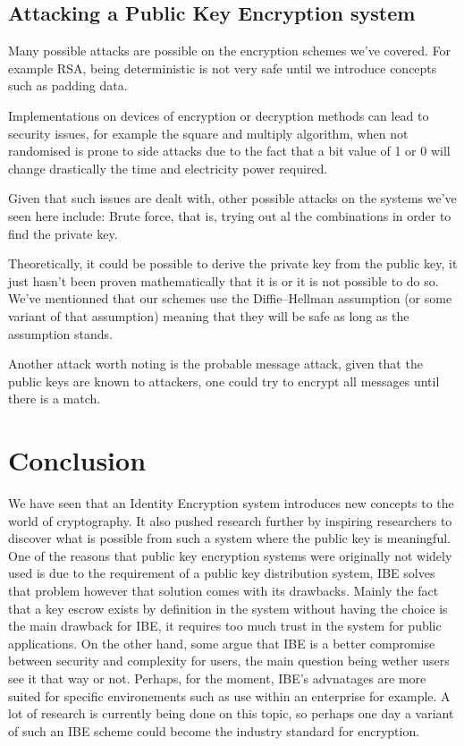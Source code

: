\documentclass[conference]{IEEEtran}
\begin{document}
\subsection{Attacking a Public Key Encryption system}
Many possible attacks are possible on the encryption schemes we've covered.
For example RSA, being deterministic is not very safe until we introduce concepts such as 
padding data. 

Implementations on devices of encryption or decryption methods 
can lead to security issues, for example the square and multiply algorithm,
when not randomised is prone to side attacks due to the fact that a bit value of 1 or 0 
will change drastically the time and electricity power required.

Given that such issues are dealt with, other possible attacks on the systems we've seen here include: 
Brute force, that is, trying out al the combinations in order to find the private key.

Theoretically, it could be possible to derive the private key from the public key, it just 
hasn't been proven mathematically that it is or it is not possible to do so.
We've mentionned that our schemes use the Diffie–Hellman assumption (or some variant of that assumption)
meaning that they will be safe as long as the assumption stands.

Another attack worth noting is the probable message attack, given that the public keys are known 
to attackers, one could try to encrypt all messages until there is a match.


\section{Conclusion}
We have seen that an Identity Encryption system 
introduces new concepts to the world of cryptography.
It also pushed research further by inspiring researchers
to discover what is possible from such a system where the public key is 
meaningful. One of the reasons that public key encryption systems 
were originally not widely used is due to the requirement of a public key 
distribution system, IBE solves that problem however that solution comes with 
its drawbacks. Mainly the fact that a key escrow exists by definition in the system 
without having the choice is the main drawback for IBE, it requires too much 
trust in the system for public applications. On the other hand, some argue that 
IBE is a better compromise between security and complexity for users, the main 
question being wether users see it that way or not.
Perhaps, for the moment, IBE's advnatages are more suited for specific 
environements such as use within an enterprise for example.  
A lot of research is currently being done on this topic, so perhaps one day a variant 
of such an IBE scheme could become the industry standard for encryption.
\end{document}
